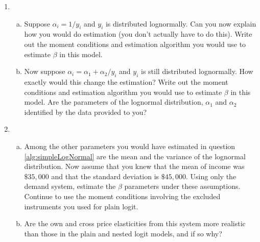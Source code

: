\documentclass[12pt]{article}
\newcounter{mycounter} %
\begin{document}
\begin{enumerate}
\setcounter{enumi}{\value{mycounter}}
\item
    \begin{enumerate}[(a)]
    \item \label{alg:simpleLogNormal} Suppose $\alpha _{i}=1/y_{i}$ and $y_{i}$ is distributed
    lognormally. Can you now explain how you would do estimation (you don't
    actually have to do this). Write out the moment conditions and estimation
    algorithm you would use to estimate $\beta $ in this model.

    \item Now suppose $\alpha_{i} = \alpha_{1} + \alpha_{2}/y_{i}$ and $y_i$ is still distributed lognormally. How exactly would this change the estimation? Write out the moment conditions and
    estimation algorithm you would use to estimate $\beta $ in this model.
    Are the parameters of the lognormal distribution, $\alpha
    _{1}$ and $\alpha _{2}$ identified by the data provided to you?
    \end{enumerate}

\item
    \begin{enumerate}[(a)]
    \item \label{est:blp} Among the other parameters you would have estimated in question \ref{alg:simpleLogNormal} are the mean and the variance of the lognormal distribution. Now
    assume that you knew that the mean of income was $\$35,000$ and that the
    standard deviation is $\$45,000$. Using only the demand system, estimate the
    $\beta $ parameters under these assumptions. Continue to use the moment conditions involving the excluded instruments you used for plain logit.
    \item Are the own and cross price
    elasticities from this system more realistic than those in the plain and nested logit models,
    and if so why?
    \end{enumerate}
\end{enumerate}
\end{document}
